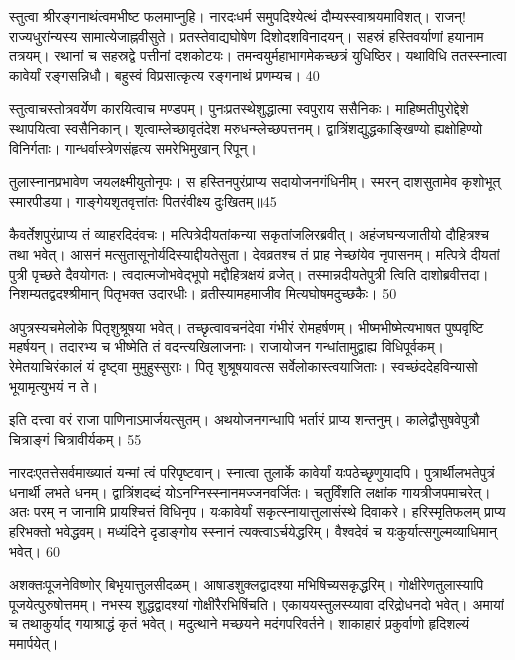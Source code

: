 स्तुत्वा श्रीरङ्गनाथंत्वमभीष्ट फलमाप्नुहि।
नारदःधर्म समुपदिश्येत्थं दौम्यस्स्वाश्रयमाविशत्।
राजन्! राज्यधुरांन्यस्य सामात्येजाह्नवीसुते।
प्रतस्तेवाद्यघोषेण दिशोदशविनादयन्।
सहस्रं हस्तिवर्याणां हयानाम तत्रयम्।
रथानां च सहस्रद्वे पत्तीनां दशकोटयः।
तमन्वयुर्महाभागमेकच्छत्रं युधिष्ठिर।
यथाविधि ततस्स्नात्वा कावेर्यां रङ्गसन्निधौ।
बहुस्वं विप्रसात्कृत्य रङ्गनाथं प्रणम्यच।
40

स्तुत्वाचस्तोत्रवर्येण कारयित्वाच मण्डपम्।
पुनःप्रतस्थेशुद्धात्मा स्वपुराय ससैनिकः।
माहिष्मतीपुरोद्देशे स्थापयित्वा स्वसैनिकान्।
शृत्वाम्लेच्छावृतंदेश मरुधन्म्लेच्छपत्तनम्।
द्वात्रिंशद्युद्धकाङ्खिण्यो ह्यक्षोहिण्यो विनिर्गताः।
गान्धर्वास्त्रेणसंहृत्य समरेभिमुखान् रिपून्।

तुलास्नानप्रभावेण जयलक्ष्मीयुतोनृपः।
स हस्तिनपुरंप्राप्य सदायोजनगंधिनीम्।
स्मरन् दाशसुतामेव कृशोभूत् स्मारपीडया।
गाङ्गेयशृतवृत्तांतः पितरंवीक्ष्य दुःखितम्॥45

कैवर्तेशपुरंप्राप्य तं व्याहरदिदंवचः।
मत्पित्रेदीयतांकन्या सकृतांजलिरब्रवीत्।
अहंजघन्यजातीयो दौहित्रश्च तथा भवेत्।
आसनं मत्सुतासूनोर्यदिस्याद्दीयतेसुता।
देवव्रतश्च तं प्राह नेच्छांयेव नृपासनम्।
मत्पित्रे दीयतां पुत्री पृच्छते दैवयोगतः।
त्वदात्मजोभवेद्भूपो मद्दौहित्रक्षयं व्रजेत्।
तस्मान्नदीयतेपुत्री त्विति दाशोब्रवीत्तदा।
निशम्यतद्वदश्श्रीमान् पितृभक्त उदारधीः।
व्रतीस्यामहमाजीव मित्यघोषमदुच्छकैः।
50

अपुत्रस्यचमेलोके पितृशुश्रूषया भवेत्।
तच्छृत्वावचनंदेवा गंभीरं रोमहर्षणम्।
भीष्मभीष्मेत्यभाषत पुष्पवृष्टि महर्षयन्।
तदारभ्य च भीष्मेति तं वदन्त्यखिलाजनाः।
राजायोजन गन्धांतामुद्वाह्य विधिपूर्वकम्।
रेमेतयाचिरंकालं यं दृष्ट्वा मुमुहुस्सुराः।
पितृ शुश्रूषयावत्स सर्वेलोकास्त्वयाजिताः।
स्वच्छंददेहविन्यासो भूयामृत्युभयं न ते।

इति दत्त्वा वरं राजा पाणिनाऽमार्जयत्सुतम्।
अथयोजनगन्धापि भर्तारं प्राप्य शन्तनुम्।
कालेद्वौसुषवेपुत्रौ चित्राङ्गं चित्रावीर्यकम्।
55

नारदःएतत्तेसर्वमाख्यातं यन्मां त्वं परिपृष्टवान्।
स्नात्वा तुलार्के कावेर्यां यःपठेच्छृणुयादपि।
पुत्रार्थीलभतेपुत्रं धनार्थी लभते धनम्।
द्वात्रिंशदब्दं योऽनग्निस्स्नानमज्जनवर्जितः।
चतुर्विंशति लक्षांक गायत्रीजपमाचरेत्।
अतः परम् न जानामि प्रायश्चित्तं विधिनृप।
यःकावेर्यां सकृत्स्नायात्तुलासंस्थे दिवाकरे।
हरिस्मृतिफलम् प्राप्य हरिभक्तो भवेद्धवम्।
मध्यंदिने दृडाङ्गोय स्स्नानं त्यक्त्वाऽर्चयेद्धरिम्।
वैश्वदेवं च यःकुर्यात्सगुल्मव्याधिमान् भवेत्।
60

अशक्तःपूजनेविष्णोर् बिभृयात्तुलसीदळम्।
आषाडशुक्लद्वादश्या मभिषिच्यसकृद्धरिम्।
गोक्षीरेणतुलास्यापि पूजयेत्पुरुषोत्तमम्।
नभस्य शुद्धद्वादश्यां गोक्षीरैरभिषिंचति।
एकाययस्तुलस्य्यावा दरिद्रोधनदो भवेत्।
अमायां च तथाकुर्याद् गयाश्राद्धं कृतं भवेत्।
मदुत्थाने मच्छयने मदंगपरिवर्तने।
शाकाहारं प्रकुर्वाणो हृदिशल्यं ममार्पयेत्।

